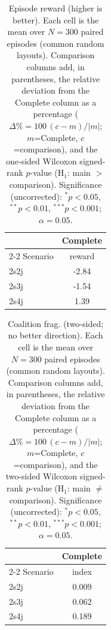 \begin{table}[ht]
  \centering
  \caption{Episode reward (higher is better). Each cell is the mean over $N=300$ paired episodes (common random layouts). Comparison columns add, in parentheses, the relative deviation from the Complete column as a percentage ($\Delta\%=100\,(c-m)/|m|$; $m$=Complete, $c$=comparison), and the one-sided Wilcoxon signed-rank $p$-value (H$_1$: main $>$ comparison). Significance (uncorrected): $^{*}p<0.05$, $^{**}p<0.01$, $^{***}p<0.001$; $\alpha=0.05$.}
  \label{tab:wilcoxon-reward}
  \small
  \begin{tabular}{l c}
    \toprule
     & Complete \\
    \cmidrule(lr){2-2}
    Scenario & {reward} \\
    \midrule
    2s2j & -2.84 \\
    2s3j & -1.54 \\
    2s4j & 1.39 \\
    \bottomrule
  \end{tabular}
\end{table}

\begin{table}[ht]
  \centering
  \caption{Coalition frag. (two-sided; no better direction). Each cell is the mean over $N=300$ paired episodes (common random layouts). Comparison columns add, in parentheses, the relative deviation from the Complete column as a percentage ($\Delta\%=100\,(c-m)/|m|$; $m$=Complete, $c$=comparison), and the two-sided Wilcoxon signed-rank $p$-value (H$_1$: main $\neq$ comparison). Significance (uncorrected): $^{*}p<0.05$, $^{**}p<0.01$, $^{***}p<0.001$; $\alpha=0.05$.}
  \label{tab:wilcoxon-fragmentation}
  \small
  \begin{tabular}{l c}
    \toprule
     & Complete \\
    \cmidrule(lr){2-2}
    Scenario & {index} \\
    \midrule
    2s2j & 0.009 \\
    2s3j & 0.062 \\
    2s4j & 0.189 \\
    \bottomrule
  \end{tabular}
\end{table}
